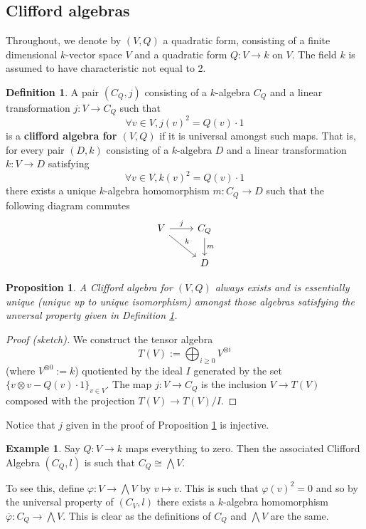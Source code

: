 \documentclass[12pt]{article}
\theoremstyle{plain}
\newtheorem{proposition}[thm]{Proposition}
\theoremstyle{definition}
\newtheorem{defn}[thm]{Definition} %
\newtheorem{example}[thm]{Example}
\newcommand{\lto}{\longrightarrow}
\begin{document}
\subsection{Clifford algebras}
Throughout, we denote by $(V,Q)$ a quadratic form, consisting of a finite dimensional $k$-vector space $V$ and a quadratic form $Q: V \lto k$ on $V$. The field $k$ is assumed to have characteristic not equal to 2.
\begin{defn}\label{def:clifford_univ_prop}
	A pair $(C_Q,j)$ consisting of a $k$-algebra $C_Q$ and a linear transformation $j: V \lto C_Q$ such that
	\begin{equation}
		\forall v \in V, j(v)^2 = Q(v)\cdot 1
	\end{equation}
	is a \textbf{clifford algebra for $(V,Q)$} if it is universal amongst such maps. That is, for every pair $(D,k)$ consisting of a $k$-algebra $D$ and a linear transformation $k: V \lto D$ satisfying
	\begin{equation}
		\forall v \in V, k(v)^2 = Q(v)\cdot 1
	\end{equation}
	there exists a unique $k$-algebra homomorphism $m: C_Q \lto D$ such that the following diagram commutes
	\begin{equation}
		\begin{tikzcd}
			V\arrow[r,"j"]\arrow[rd,"k"] & C_Q\arrow[d,"m"]\\
			& D
		\end{tikzcd}
	\end{equation}
\end{defn}
\begin{proposition}\label{prop:clifford_construction}
	A Clifford algebra for $(V,Q)$ always exists and is essentially unique (unique up to unique isomorphism) amongst those algebras satisfying the unversal property given in Definition \ref{def:clifford_univ_prop}.
\end{proposition}
\begin{proof}[Proof (sketch)]
	We construct the tensor algebra
	\begin{equation}
		T(V) := \bigoplus_{i \geq 0}V^{\otimes i}
	\end{equation}
	(where $V^{\otimes 0} := k$) quotiented by the ideal $I$ generated by the set $\lbrace v \otimes v - Q(v)\cdot 1\rbrace_{v \in V}$. The map $j: V \lto C_Q$ is the inclusion $V \lto T(V)$ composed with the projection $T(V) \lto T(V)/I$.
\end{proof}
Notice that $j$ given in the proof of Proposition \ref{prop:clifford_construction} is injective.
\begin{example}\label{ex:clifford_exterior}
	Say $Q: V \lto k$ maps everything to zero. Then the associated Clifford Algebra $(C_Q,l)$ is such that $C_Q \cong \bigwedge V$.
	
	To see this, define $\varphi: V \lto \bigwedge V$ by $v \mapsto v$. This is such that $\varphi(v)^2 = 0$ and so by the universal property of $(C_V,l)$ there exists a $k$-algebra homomorphism $\overline{\varphi}: C_Q \lto \bigwedge V$. This is clear as the definitions of $C_Q$ and $\bigwedge V$ are the same.
\end{example}
\end{document}
